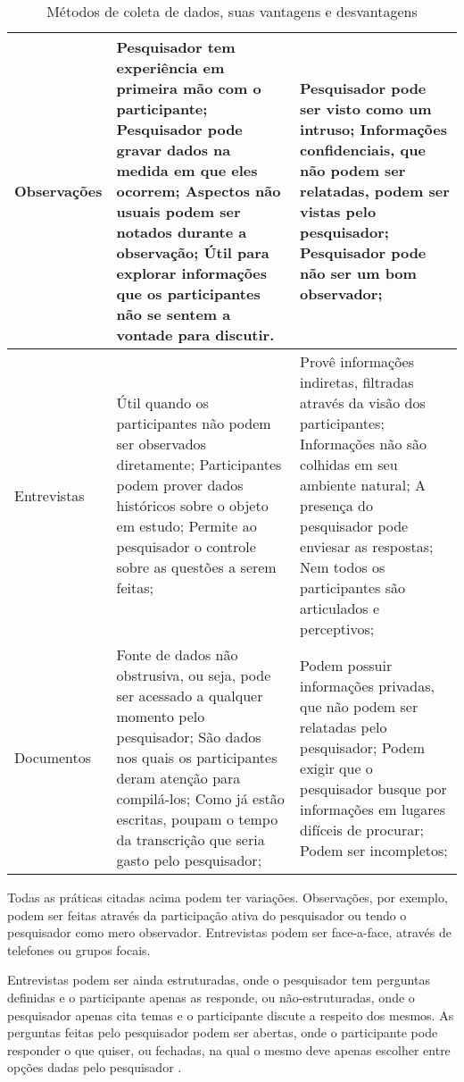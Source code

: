 \begin{table}
	\begin{tabular}{ | p{3cm} | p{6cm} | p{6cm} | }
		\hline
		Observações &
		  Pesquisador tem experiência em primeira mão com o participante;
		  Pesquisador pode gravar dados na medida em que eles ocorrem;
		  Aspectos não usuais podem ser notados durante a observação;
		  Útil para explorar informações que os participantes não se sentem a
		  vontade para discutir.
		&
		  Pesquisador pode ser visto como um intruso;
		  Informações confidenciais, que não podem ser relatadas, podem ser
		  vistas pelo pesquisador;
		  Pesquisador pode não ser um bom observador;
		\\
		\hline
		Entrevistas &
		  Útil quando os participantes não podem ser observados diretamente;
		  Participantes podem prover dados históricos sobre o objeto em estudo;
		  Permite ao pesquisador o controle sobre as questões a serem feitas;
		&
		  Provê informações indiretas, filtradas através da visão dos
		  participantes;
		  Informações não são colhidas em seu ambiente natural;
		  A presença do pesquisador pode enviesar as respostas;
		  Nem todos os participantes são articulados e perceptivos;
		\\
		\hline
		Documentos &
		  Fonte de dados não obstrusiva, ou seja, pode ser acessado a qualquer
		  momento pelo pesquisador;
		  São dados nos quais os participantes deram atenção para compilá-los;
		  Como já estão escritas, poupam o tempo da transcrição que
		  seria gasto pelo pesquisador;
		&
		  Podem possuir informações privadas, que não podem ser relatadas pelo
		  pesquisador;
		  Podem exigir que o pesquisador busque por informações em lugares
		  difíceis de procurar;
		  Podem ser incompletos;
		\\			
		\hline
	\end{tabular}
	\caption{Métodos de coleta de dados, suas vantagens e desvantagens}
	\label{tab:coleta-de-dados}
\end{table}

Todas as práticas citadas acima podem ter variações. Observações, por exemplo,
podem ser feitas através da participação ativa do pesquisador ou tendo o
pesquisador como mero observador. Entrevistas podem ser face-a-face, através de
telefones ou grupos focais. 

Entrevistas podem ser ainda estruturadas, onde o
pesquisador tem perguntas definidas e o participante apenas as responde, ou
não-estruturadas, onde o pesquisador apenas cita temas e o participante discute
a respeito dos mesmos. As perguntas feitas pelo pesquisador podem ser abertas,
onde o participante pode responder o que quiser, ou fechadas, na qual o mesmo
deve apenas escolher entre opções dadas pelo pesquisador \cite{seaman}.

